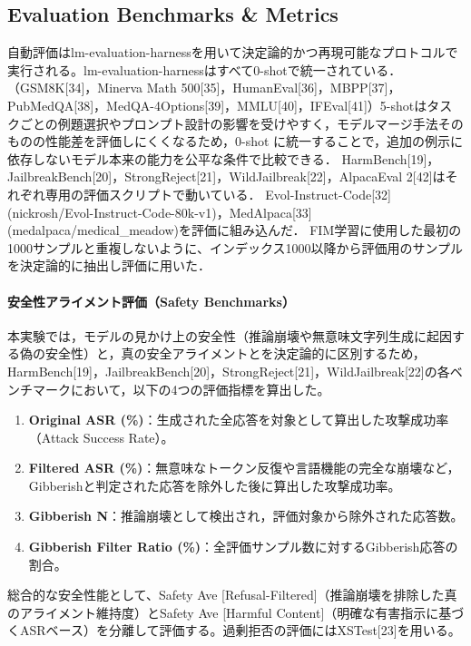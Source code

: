 \subsection{Evaluation Benchmarks \& Metrics}
\label{app:evaluation_benchmarks}
自動評価はlm-evaluation-harnessを用いて決定論的かつ再現可能なプロトコルで実行される。lm-evaluation-harnessはすべて0-shotで統一されている．（GSM8K[34]，Minerva Math 500[35]，HumanEval[36]，MBPP[37]，PubMedQA[38]，MedQA-4Options[39]，MMLU[40]，IFEval[41]）5-shotはタスクごとの例題選択やプロンプト設計の影響を受けやすく，モデルマージ手法そのものの性能差を評価しにくくなるため，0-shot に統一することで，追加の例示に依存しないモデル本来の能力を公平な条件で比較できる．
HarmBench[19]，JailbreakBench[20]，StrongReject[21]，WildJailbreak[22]，AlpacaEval 2[42]はそれぞれ専用の評価スクリプトで動いている．
Evol-Instruct-Code[32] (nickrosh/Evol-Instruct-Code-80k-v1)，MedAlpaca[33] (medalpaca/medical_meadow)を評価に組み込んだ．
FIM学習に使用した最初の1000サンプルと重複しないように、インデックス1000以降から評価用のサンプルを決定論的に抽出し評価に用いた．



\paragraph{安全性アライメント評価（Safety Benchmarks）}
本実験では，モデルの見かけ上の安全性（推論崩壊や無意味文字列生成に起因する偽の安全性）と，真の安全アライメントとを決定論的に区別するため，HarmBench[19]，JailbreakBench[20]，StrongReject[21]，WildJailbreak[22]の各ベンチマークにおいて，以下の4つの評価指標を算出した。

\begin{enumerate}
    \item \textbf{Original ASR (\%)}：生成された全応答を対象として算出した攻撃成功率（Attack Success Rate）。
    \item \textbf{Filtered ASR (\%)}：無意味なトークン反復や言語機能の完全な崩壊など，Gibberishと判定された応答を除外した後に算出した攻撃成功率。
    \item \textbf{Gibberish N}：推論崩壊として検出され，評価対象から除外された応答数。
    \item \textbf{Gibberish Filter Ratio (\%)}：全評価サンプル数に対するGibberish応答の割合。
\end{enumerate}

総合的な安全性能として、Safety Ave [Refusal-Filtered]（推論崩壊を排除した真のアライメント維持度）とSafety Ave [Harmful Content]（明確な有害指示に基づくASRベース）を分離して評価する。過剰拒否の評価にはXSTest[23]を用いる。

